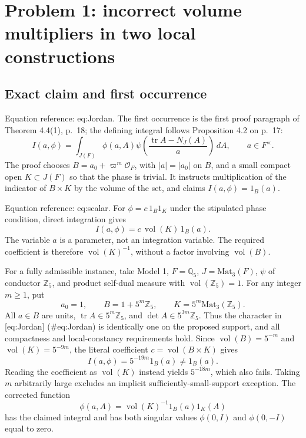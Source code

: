 \documentclass[10pt]{article}
\begin{document}
\section*{Problem 1: incorrect volume multipliers in two local constructions}
\subsection*{Exact claim and first occurrence}
Equation reference: eq:Jordan. The first occurrence is the first proof paragraph of Theorem 4.4(1), p. 18; the defining integral follows Proposition 4.2 on p. 17: \[
 I(a,\phi)=\int_{J(F)}\phi(a,A)
 \psi\!\left(\frac{\operatorname{tr}A-N_J(A)}{a}\right)\,dA,\qquad a\in F^\times.\] The proof chooses \(B=a_0+\varpi^m\mathcal O_F\), with \(|a|=|a_0|\) on \(B\), and a small compact open \(K\subset J(F)\) so that the phase is trivial. It instructs multiplication of the indicator of \(B\times K\) by the volume of the set, and claims \(I(a,\phi)=1_B(a)\).\par
Equation reference: eq:scalar. For \(\phi=c\,1_B1_K\) under the stipulated phase condition, direct integration gives \[
 I(a,\phi)=c\,\operatorname{vol}(K)\,1_B(a).\] The variable \(a\) is a parameter, not an integration variable. The required coefficient is therefore \(\operatorname{vol}(K)^{-1}\), without a factor involving \(\operatorname{vol}(B)\).\par
For a fully admissible instance, take Model 1, \(F=\mathbb Q_5\), \(J=\mathrm{Mat}_3(F)\), \(\psi\) of conductor \(\mathbb Z_5\), and product self-dual measure with \(\operatorname{vol}(\mathbb Z_5)=1\). For any integer \(m\ge1\), put \[a_0=1,\qquad B=1+5^m\mathbb Z_5,\qquad
 K=5^m\mathrm{Mat}_3(\mathbb Z_5).\] All \(a\in B\) are units, \(\operatorname{tr}A\in5^m\mathbb Z_5\), and \(\det A\in5^{3m}\mathbb Z_5\). Thus the character in [eq:Jordan] (\#eq:Jordan) is identically one on the proposed support, and all compactness and local-constancy requirements hold. Since \(\operatorname{vol}(B)=5^{-m}\) and \(\operatorname{vol}(K)=5^{-9m}\), the literal coefficient \(c=\operatorname{vol}(B\times K)\) gives \[I(a,\phi)=5^{-19m}1_B(a)\ne1_B(a).\] Reading the coefficient as \(\operatorname{vol}(K)\) instead yields \(5^{-18m}\), which also fails. Taking \(m\) arbitrarily large excludes an implicit sufficiently-small-support exception. The corrected function \[\phi(a,A)=\operatorname{vol}(K)^{-1}1_B(a)1_K(A)\] has the claimed integral and has both singular values \(\phi(0,I)\) and \(\phi(0,-I)\) equal to zero.\par
\end{document}
